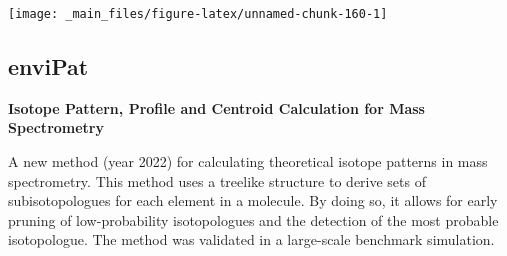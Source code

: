 \documentclass[
]{book}
\newenvironment{Shaded}{\begin{snugshade}}{\end{snugshade}}
\newcommand{\AttributeTok}[1]{\textcolor[rgb]{0.77,0.63,0.00}{#1}}
\newcommand{\DecValTok}[1]{\textcolor[rgb]{0.00,0.00,0.81}{#1}}
\newcommand{\FunctionTok}[1]{\textcolor[rgb]{0.00,0.00,0.00}{#1}}
\newcommand{\NormalTok}[1]{#1}
\newcommand{\OtherTok}[1]{\textcolor[rgb]{0.56,0.35,0.01}{#1}}
\newcommand{\SpecialCharTok}[1]{\textcolor[rgb]{0.00,0.00,0.00}{#1}}
\newcommand{\StringTok}[1]{\textcolor[rgb]{0.31,0.60,0.02}{#1}}
\begin{document}
\begin{Shaded}
\end{Shaded}

\begin{center}\texttt{[image: \_main\_files/figure-latex/unnamed-chunk-160-1]} \end{center}

\hypertarget{envipat}{%
\subsection{enviPat}\label{envipat}}

\textbf{Isotope Pattern, Profile and Centroid Calculation for Mass Spectrometry}

A new method (year 2022) for calculating theoretical isotope patterns in mass spectrometry. This method uses a treelike structure to derive sets of subisotopologues for each element in a molecule. By doing so, it allows for early pruning of low-probability isotopologues and the detection of the most probable isotopologue. The method was validated in a large-scale benchmark simulation.

\hfill\break
\end{document}

